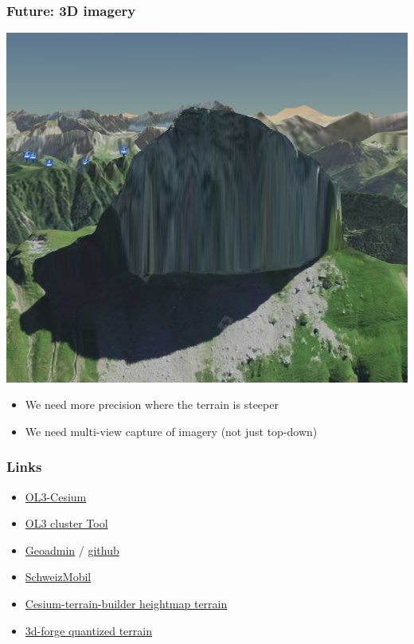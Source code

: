 \documentclass[handout]{beamer}
\begin{document}
  \begin{frame}
    \frametitle{Future: 3D imagery}
    \begin{center}
      \includegraphics[width=0.6\linewidth]{images/schweizmobil_cesium_steep_raster.png}
    \end{center}
    \begin{itemize}
      \item We need more precision where the terrain is steeper
        \pause
      \item We need multi-view capture of imagery (not just top-down)
    \end{itemize}
  \end{frame}

  \begin{frame}
    \frametitle{Links}
    \begin{itemize}
      \item \href {https://github.com/openlayers/ol3-cesium}{OL3-Cesium}
      \item \href {https://github.com/gberaudo/ol3-cluster-tool}{OL3 cluster Tool}
      \item \href {https://github.com/geoadmin/mf-geoadmin3}{Geoadmin} / \href {https://map.geo.admin.ch}{github}
      \item \href {https://map.schweizmobil.ch}{SchweizMobil}
      \item \href {https://github.com/geo-data/cesium-terrain-builder}{Cesium-terrain-builder heightmap terrain}
      \item \href {https://github.com/geoadmin/3d-forge}{3d-forge quantized terrain}
    \end{itemize}
  \end{frame}
\end{document}
